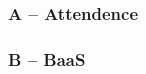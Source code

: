 \documentclass{beamer}
\begin{document}
  \begin{frame}
    \frametitle{A -- Attendence}
  \end{frame}
  \begin{frame}
    \frametitle{B -- BaaS}
  \end{frame}
\end{document}
